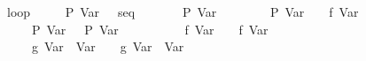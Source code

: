 \begin{isabellebody}
\ \ {}\ loop\isanewline
\ \ \ \ {}\ {}{}P\ {}Var\ {}{}{}\ {}\ seq\isanewline
\ \ \ \ \ \ {}\ P\ {}Var\ {}{}\isanewline
\ \ \ \ \ \ {}\ {}{}{}P\ {}Var\ {}{}{}{}\ {}\ {}{}\ f\ {}Var\ {}{}{}\isanewline
\ \ \ \ \ \ {}\ P\ {}Var\ {}{}{}\ {}\ {}P\ {}Var\ {}{}{}\isanewline
\ \ \ \ \ \ {}\ {}\ {}{}\ f\ {}Var\ {}{}{}\ {}\ {}{}\ f\ {}Var\ {}{}\isanewline
\ \ \ \ \ \ {}\isanewline
\ \ \ \ {}\ {}\ {}{}\ g\ {}Var\ {}{}\ {}Var\ {}{}{}\ {}\ {}{}\ g\ {}Var\ {}{}\ {}Var\ {}{}\isanewline

\end{isabellebody}
